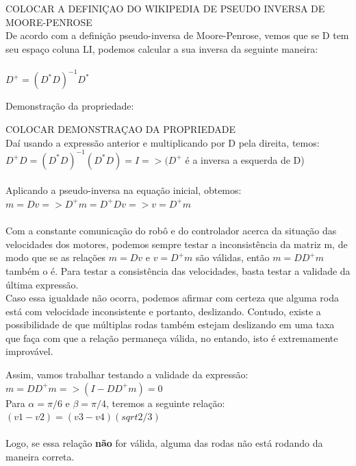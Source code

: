 \documentclass{article}
\begin{document}
COLOCAR A DEFINIÇAO DO WIKIPEDIA DE PSEUDO INVERSA DE MOORE-PENROSE \\

De acordo com a definição pseudo-inversa de Moore-Penrose, vemos que se D tem seu espaço coluna LI, podemos calcular a sua inversa da seguinte maneira:
\\ \\ $D^+ = (D^*D)^{-1} D^*$

Demonstração da propriedade:

COLOCAR DEMONSTRAÇAO DA PROPRIEDADE \\

Daí usando a expressão anterior e multiplicando por D pela direita, temos:
\\ $D^+D = (D^*D)^{-1}(D^*D) = I => (D^+$ é a inversa a esquerda de D)  
\\ \\ Aplicando a pseudo-inversa na equação inicial, obtemos:
$ m = Dv => D^+m = D^+Dv => v = D^+m$
\\ \\ Com a constante comunicação do robô e do controlador acerca da situação das velocidades dos motores, podemos sempre testar a inconsistência da matriz m, de modo que
se as relações $m = Dv$ e $v = D^+m$ são válidas, então $m = DD^+m$ também o é. Para testar a consistência das velocidades, basta testar a validade da última expressão.
\\ Caso essa igualdade não ocorra, podemos afirmar com certeza que alguma roda está com velocidade inconsistente e portanto, deslizando. Contudo, existe a possibilidade de que múltiplas rodas também estejam deslizando em uma taxa que faça com que a relação permaneça válida,
no entando, isto é extremamente improvável.

Assim, vamos trabalhar testando a validade da expressão:
\\ $ m = DD^+m => (I - DD^+m) = 0$
\\ Para $\alpha = \pi/6$ e $\beta = \pi/4$, teremos a seguinte relação:
\\ $(v1 - v2) = (v3 - v4)(sqrt{2/3})$
\\ \\ Logo, se essa relação \textbf{não} for válida, alguma das rodas não está rodando da maneira correta.
\end{document}
